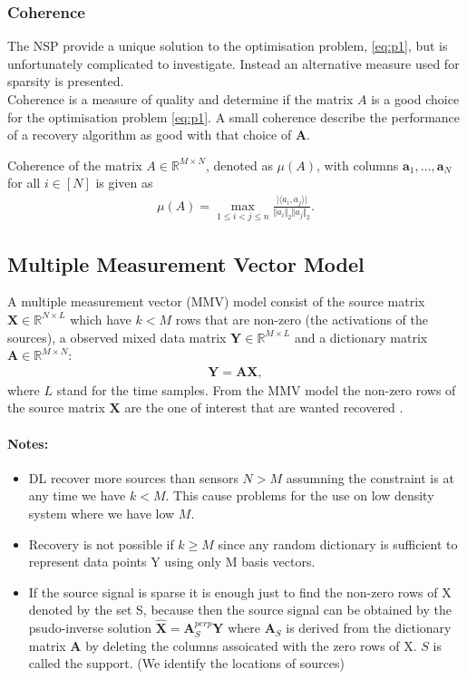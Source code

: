 \subsubsection{Coherence}
The NSP provide a unique solution to the optimisation problem, \eqref{eq:p1}, but is unfortunately complicated to investigate. Instead an alternative measure used for sparsity is presented.
\\%
Coherence is a measure of quality and determine if the matrix $A$ is a good choice for the optimisation problem \eqref{eq:p1}. A small coherence describe the performance of a recovery algorithm as good with that choice of $\mathbf{A}$. 
\begin{definition}[Coherence]
Coherence of the matrix $A \in \mathbb{R}^{M \times N}$, denoted as $\mu (A)$, with columns $\mathbf{a}_1, \dots, \mathbf{a}_N$ for all $i \in [N]$ is given as
\begin{align*}
\mu (A) = \max_{1 \leq i < j \leq n} \frac{\vert \langle a_i, a_j \rangle \vert}{\Vert a_i \Vert_2 \Vert a_j \Vert_2}.
\end{align*}
\end{definition}


\subsection{Multiple Measurement Vector Model}
A multiple measurement vector (MMV) model consist of the source matrix $\mathbf{X} \in \mathbb{R}^{N \times L}$ which have $k < M$ rows that are non-zero (the activations of the sources), a observed mixed data matrix $\mathbf{Y} \in \mathbb{R}^{M \times L}$ and a dictionary matrix $\mathbf{A} \in \mathbb{R}^{M \times N}$:
\begin{align*}
\mathbf{Y} = \mathbf{AX},
\end{align*}
where $L$ stand for the time samples. From the MMV model the non-zero rows of the source matrix $\mathbf{X}$ are the one of interest that are wanted recovered \cite[p. 11]{PHD}.


\paragraph{Notes:}
\begin{itemize}
\item DL recover more sources than sensors $N > M$ assumning the constraint is at any time we have $k < M$. This cause problems for the use on low density system where we have low $M$.
\item Recovery is not possible if $k \geq M$ since any random dictionary is sufficient to represent data points Y using only M basis vectors.
\item If the source signal is sparse it is enough just to find the non-zero rows of X denoted by the set S, because then the source signal can be obtained by the psudo-inverse solution $\hat{\mathbf{X}} = \mathbf{A}_S^{perp} \mathbf{Y}$ where $\mathbf{A}_S$ is derived from the dictionary matrix $\mathbf{A}$ by deleting the columns assoicated with the zero rows of X. $S$ is called the support. (We identify the locations of sources)
\end{itemize}